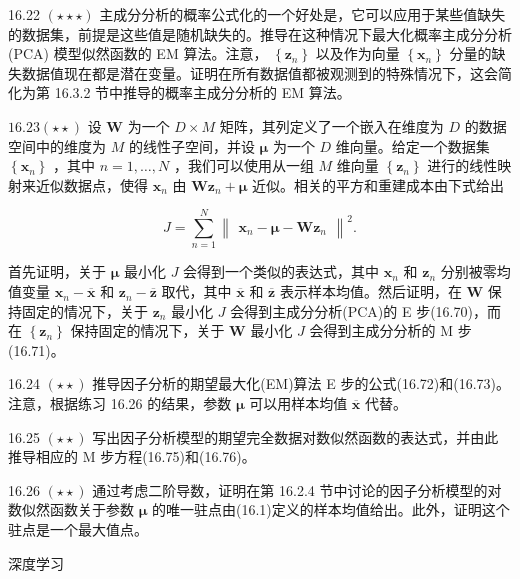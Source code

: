\documentclass[10pt]{article}
\begin{document}
16.22 \(\left( {\star  \star   \star  }\right)\) 主成分分析的概率公式化的一个好处是，它可以应用于某些值缺失的数据集，前提是这些值是随机缺失的。推导在这种情况下最大化概率主成分分析 (PCA) 模型似然函数的 EM 算法。注意， \(\left\{  {\mathbf{z}}_{n}\right\}\) 以及作为向量 \(\left\{  {\mathbf{x}}_{n}\right\}\) 分量的缺失数据值现在都是潜在变量。证明在所有数据值都被观测到的特殊情况下，这会简化为第 16.3.2 节中推导的概率主成分分析的 EM 算法。

\({16.23}\left( {\star  \star  }\right)\) 设 \(\mathbf{W}\) 为一个 \(D \times  M\) 矩阵，其列定义了一个嵌入在维度为 \(D\) 的数据空间中的维度为 \(M\) 的线性子空间，并设 \(\mathbf{\mu }\) 为一个 \(D\) 维向量。给定一个数据集 \(\left\{  {\mathbf{x}}_{n}\right\}\) ，其中 \(n = 1,\ldots ,N\) ，我们可以使用从一组 \(M\) 维向量 \(\left\{  {\mathbf{z}}_{n}\right\}\) 进行的线性映射来近似数据点，使得 \({\mathbf{x}}_{n}\) 由 \(\mathbf{W}{\mathbf{z}}_{n} + \mathbf{\mu }\) 近似。相关的平方和重建成本由下式给出

\[
J = \mathop{\sum }\limits_{{n = 1}}^{N}{\begin{Vmatrix}{\mathbf{x}}_{n} - \mathbf{\mu } - \mathbf{W}{\mathbf{z}}_{n}\end{Vmatrix}}^{2}. \tag{16.90}
\]

首先证明，关于 \(\mathbf{\mu }\) 最小化 \(J\) 会得到一个类似的表达式，其中 \({\mathbf{x}}_{n}\) 和 \({\mathbf{z}}_{n}\) 分别被零均值变量 \({\mathbf{x}}_{n} - \overline{\mathbf{x}}\) 和 \({\mathbf{z}}_{n} - \overline{\mathbf{z}}\) 取代，其中 \(\overline{\mathbf{x}}\) 和 \(\overline{\mathbf{z}}\) 表示样本均值。然后证明，在 \(\mathbf{W}\) 保持固定的情况下，关于 \({\mathbf{z}}_{n}\) 最小化 \(J\) 会得到主成分分析(PCA)的 E 步(16.70)，而在 \(\left\{  {\mathbf{z}}_{n}\right\}\) 保持固定的情况下，关于 \(\mathbf{W}\) 最小化 \(J\) 会得到主成分分析的 M 步(16.71)。

16.24 \(\left( {\star  \star  }\right)\) 推导因子分析的期望最大化(EM)算法 E 步的公式(16.72)和(16.73)。注意，根据练习 16.26 的结果，参数 \(\mathbf{\mu }\) 可以用样本均值 \(\overline{\mathbf{x}}\) 代替。

16.25 \(\left( {\star  \star  }\right)\) 写出因子分析模型的期望完全数据对数似然函数的表达式，并由此推导相应的 M 步方程(16.75)和(16.76)。

16.26 \(\left( {\star  \star  }\right)\) 通过考虑二阶导数，证明在第 16.2.4 节中讨论的因子分析模型的对数似然函数关于参数 \(\mathbf{\mu }\) 的唯一驻点由(16.1)定义的样本均值给出。此外，证明这个驻点是一个最大值点。

深度学习
\end{document}
